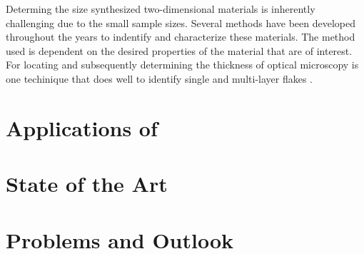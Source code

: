 \documentclass[%
 reprint,
 amsmath,amssymb,
 aps,
pra,
floatfix,
]{revtex4-1}
\begin{document}
Determing the size synthesized two-dimensional materials is inherently challenging due to the small sample sizes. Several methods have been developed throughout the years to indentify and characterize these materials. The method used is dependent on the desired properties of the material that are of interest. For locating and subsequently determining the thickness of  optical microscopy is one techinique that does well to identify single and multi-layer flakes \cite{acsnanoReview2013}.

\section{\label{sec:mos2_applications} Applications of }

\section{\label{sec:state_of_the_art} State of the Art}

\section{\label{sec:problems_and_outlook} Problems and Outlook}




\end{document}
